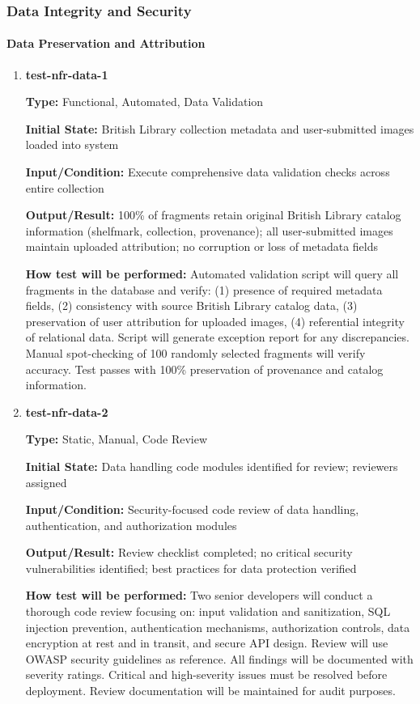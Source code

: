 \documentclass[12pt, titlepage]{article}
\begin{document}
\subsubsection{Data Integrity and Security}

\paragraph{Data Preservation and Attribution}

\begin{enumerate}

\item \textbf{test-nfr-data-1}

\textbf{Type:} Functional, Automated, Data Validation
					
\textbf{Initial State:} British Library collection metadata and user-submitted images loaded into system
					
\textbf{Input/Condition:} Execute comprehensive data validation checks across entire collection
					
\textbf{Output/Result:} 100\% of fragments retain original British Library catalog information (shelfmark, collection, provenance); all user-submitted images maintain uploaded attribution; no corruption or loss of metadata fields
					
\textbf{How test will be performed:} Automated validation script will query all fragments in the database and verify: (1) presence of required metadata fields, (2) consistency with source British Library catalog data, (3) preservation of user attribution for uploaded images, (4) referential integrity of relational data. Script will generate exception report for any discrepancies. Manual spot-checking of 100 randomly selected fragments will verify accuracy. Test passes with 100\% preservation of provenance and catalog information.

\item \textbf{test-nfr-data-2}

\textbf{Type:} Static, Manual, Code Review
					
\textbf{Initial State:} Data handling code modules identified for review; reviewers assigned
					
\textbf{Input/Condition:} Security-focused code review of data handling, authentication, and authorization modules
					
\textbf{Output/Result:} Review checklist completed; no critical security vulnerabilities identified; best practices for data protection verified
					
\textbf{How test will be performed:} Two senior developers will conduct a thorough code review focusing on: input validation and sanitization, SQL injection prevention, authentication mechanisms, authorization controls, data encryption at rest and in transit, and secure API design. Review will use OWASP security guidelines as reference. All findings will be documented with severity ratings. Critical and high-severity issues must be resolved before deployment. Review documentation will be maintained for audit purposes.

\end{enumerate}
\end{document}

